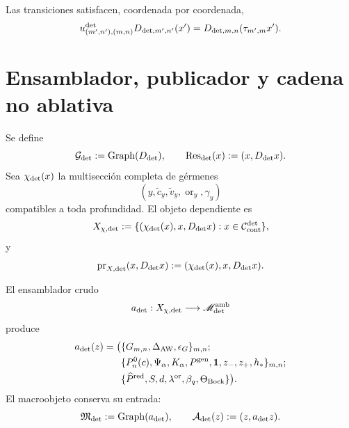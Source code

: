 Las transiciones satisfacen, coordenada por coordenada,
\begin{equation}\label{eq:detint-naturalidad-trece}
 u^{\rm det}_{(m',n'),(m,n)}D_{{\rm det},m',n'}(x')
 =D_{{\rm det},m,n}(\tau_{m',m}x').
\end{equation}

\section{Ensamblador, publicador y cadena no ablativa}

Se define
\begin{equation}\label{eq:detint-graph-d}
 \mathcal G_{\rm det}:=\operatorname{Graph}(D_{\rm det}),
 \qquad
 \operatorname{Res}_{\rm det}(x):=(x,D_{\rm det}x).
\end{equation}
Sea \(\chi_{\rm det}(x)\) la multisección completa de gérmenes
\[
 (y,\widetilde c_y,\widetilde v_y,\operatorname{or}_y,\gamma_y)
\]
compatibles a toda profundidad. El objeto dependiente es
\begin{equation}\label{eq:detint-x-dependiente}
 X_{\chi,{\rm det}}
 :=\{(\chi_{\rm det}(x),x,D_{\rm det}x):
 x\in\mathcal C_{\rm cont}^{\rm det}\},
\end{equation}
y
\begin{equation}\label{eq:detint-prx}
 \operatorname{pr}_{X,{\rm det}}(x,D_{\rm det}x)
 :=(\chi_{\rm det}(x),x,D_{\rm det}x).
\end{equation}

El ensamblador crudo
\begin{equation}\label{eq:detint-ensamblador-crudo}
 a_{\rm det}:X_{\chi,{\rm det}}\longrightarrow
 \mathscr M_{\rm det}^{\rm amb}
\end{equation}
produce
\begin{equation}\label{eq:detint-ensamblador-salida}
\begin{split}
 a_{\rm det}(z)=\bigl(&
 \{G_{m,n},\Delta_{\rm AW},\epsilon_G\}_{m,n};\\
 &\{P_n^0(c),\Psi_\alpha,K_\alpha,P^{\rm gen},
 \mathbf1,z_-,z_+,h_*\}_{m,n};\\
 &\{\widehat P^{\rm red},S,d,\lambda^{\rm or},
 \beta_q,\Theta_{\rm Bock}\}\bigr).
\end{split}
\end{equation}
El macroobjeto conserva su entrada:
\begin{equation}\label{eq:detint-graph-a}
 \mathfrak M_{\rm det}:=\operatorname{Graph}(a_{\rm det}),
 \qquad
 \mathcal A_{\rm det}(z):=(z,a_{\rm det}z).
\end{equation}

